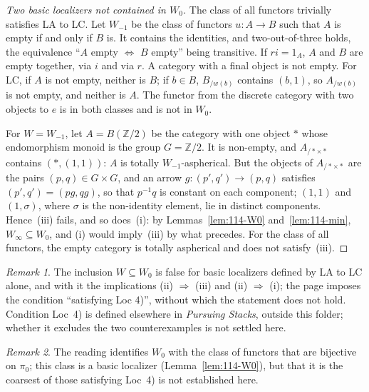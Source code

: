 \documentclass[11pt]{article}
\newcommand{\q}[1]{“#1”}
\theoremstyle{plain}
\theoremstyle{definition}
\theoremstyle{remark}
\newtheorem*{remarque}{Remark}
\begin{document}
\begin{proof}[Two basic localizers not contained in $W_0$]
The class of all functors trivially satisfies LA to LC. Let $W_{-1}$ be the class of functors $u : A \to B$ such that $A$ is empty if and only if $B$ is. It contains the identities, and two-out-of-three holds, the equivalence \q{$A$ empty $\iff$ $B$ empty} being transitive. If $ri = 1_A$, $A$ and $B$ are empty together, via $i$ and via $r$. A category with a final object is not empty. For LC, if $A$ is not empty, neither is $B$; if $b \in B$, $B_{/w(b)}$ contains $(b, 1)$, so $A_{/w(b)}$ is not empty, and neither is $A$. The functor from the discrete category with two objects to $e$ is in both classes and is not in $W_0$.

For $W = W_{-1}$, let $A = B(\mathbb Z/2)$ be the category with one object $\ast$ whose endomorphism monoid is the group $G = \mathbb Z/2$. It is non-empty, and $A_{/\ast \times \ast}$ contains $(\ast, (1, 1))$: $A$ is totally $W_{-1}$-aspherical. But the objects of $A_{/\ast \times \ast}$ are the pairs $(p, q) \in G \times G$, and an arrow $g : (p', q') \to (p, q)$ satisfies $(p', q') = (pg, qg)$, so that $p^{-1}q$ is constant on each component; $(1, 1)$ and $(1, \sigma)$, where $\sigma$ is the non-identity element, lie in distinct components. Hence~(iii) fails, and so does~(i): by Lemmas~\ref{lem:114-W0} and~\ref{lem:114-min}, $W_\infty \subseteq W_0$, and (i) would imply~(iii) by what precedes. For the class of all functors, the empty category is totally aspherical and does not satisfy~(iii).
\end{proof}

\begin{remarque}
The inclusion $W \subseteq W_0$ is false for basic localizers defined by LA to LC alone, and with it the implications (ii) $\Rightarrow$ (iii) and (ii) $\Rightarrow$ (i); the page imposes the condition \q{satisfying Loc 4)}, without which the statement does not hold. Condition Loc~4) is defined elsewhere in \emph{Pursuing Stacks}, outside this folder; whether it excludes the two counterexamples is not settled here.
\end{remarque}

\begin{remarque}
The reading identifies $W_0$ with the class of functors that are bijective on $\pi_0$; this class is a basic localizer (Lemma~\ref{lem:114-W0}), but that it is the coarsest of those satisfying Loc~4) is not established here.
\end{remarque}
\end{document}
